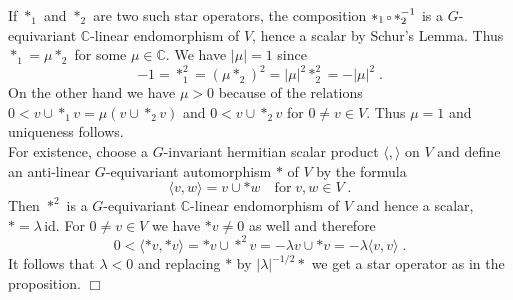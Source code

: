 \documentclass[12pt,leqno]{article}
\newcommand{\C}{{\mathbb{C}}}
\newcommand{\id}{\mathrm{id}}
\newenvironment{proof}{\noindent {\bf Proof}}{\mbox{}\hspace*{\fill}$\Box$}
\newcommand{\verk}{\mbox{\scriptsize $\,\circ\,$}}
\begin{document}
\begin{proof}
If $*_1$ and $*_2$ are two such star operators, the composition $*_1 \verk *^{-1}_2$ is a $G$-equivariant $\C$-linear endomorphism of $V$, hence a scalar by Schur's Lemma. Thus $*_1 = \mu *_2$ for some $\mu \in \C$. We have $|\mu| = 1$ since
\[
-1 = *^2_1 = (\mu *_2)^2 = |\mu|^2 *^2_2 = - |\mu|^2 \; .
\]
On the other hand we have $\mu > 0$ because of the relations $0 < v \cup *_1 v = \mu (v \cup *_2 v)$ and $0 < v \cup *_2 v$ for $0 \neq v \in V$. Thus $\mu = 1$ and uniqueness follows. \\
For existence, choose a $G$-invariant hermitian scalar product $\langle , \rangle$ on $V$ and define an anti-linear $G$-equivariant automorphism $*$ of $V$ by the formula
\[
\langle v,w \rangle = v \cup *w \quad \text{for} \; v,w \in V \; .
\]
Then $*^2$ is a $G$-equivariant $\C$-linear endomorphism of $V$ and hence a scalar, $* = \lambda \, \id$. For $0 \neq v \in V$ we have $* v \neq 0$ as well and therefore
\[
0 < \langle *v , *v \rangle = *v \cup *^2v = - \lambda v \cup *v = - \lambda \langle v,v \rangle \; .
\]
It follows that $\lambda < 0$ and replacing $*$ by $|\lambda|^{-1/2} *$ we get a star operator as in the proposition. 
\end{proof}
\end{document}
